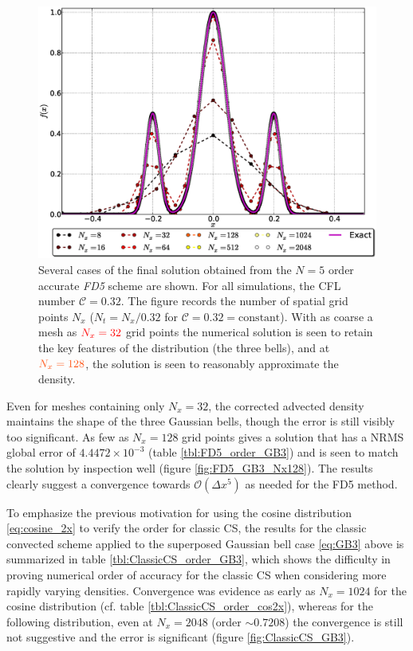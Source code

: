 \documentclass[11pt,titlepage]{report}
\begin{document}
\begin{figure}[h!]
 \centering
   \includegraphics[width=\textwidth]{graphics/plot_-_GB3_FD5_Nxall_dashdot_w_Nx2048.eps}
 \caption{Several cases of the final solution obtained from the $N = 5$ order accurate \emph{FD5} scheme are shown. For all simulations, the CFL number $\mathcal{C} = 0.32$. The figure records the number of spatial grid points $N_x$ ($N_t = N_x / 0.32$ for $\mathcal{C} = 0.32 = \text{constant}$). With as coarse a mesh as $\textcolor{red}{N_x = 32}$ grid points the numerical solution is seen to retain the key features of the distribution (the three bells), and at $\textcolor{darkorange}{N_x = 128}$, the solution is seen to reasonably approximate the density.}
 \label{fig:FD5_GB3_several_cases}
\end{figure}

\noindent Even for meshes containing only $N_x = 32$, the corrected advected density maintains the shape of the three Gaussian bells, though the error is still visibly too significant. As few as $N_x = 128$ grid points gives a solution that has a NRMS global error of $4.4472\times 10^{-3}$ (table \ref{tbl:FD5_order_GB3}) and is seen to match the solution by inspection well (figure \ref{fig:FD5_GB3_Nx128}). The results clearly suggest a convergence towards $\mathcal{O}(\Delta x^5)$ as needed for the FD5 method.

To emphasize the previous motivation for using the cosine distribution \eqref{eq:cosine_2x} to verify the order for classic CS, the results for the classic convected scheme applied to the superposed Gaussian bell case \eqref{eq:GB3} above is summarized in table \ref{tbl:ClassicCS_order_GB3}, which shows the difficulty in proving numerical order of accuracy for the classic CS when considering more rapidly varying densities. Convergence was evidence as early as $N_x = 1024$ for the cosine distribution (cf. table \ref{tbl:ClassicCS_order_cos2x}), whereas for the following distribution, even at $N_x = 2048$ (order $\sim 0.7208$) the convergence is still not suggestive and the error is significant (figure \ref{fig:ClassicCS_GB3}).
\end{document}
